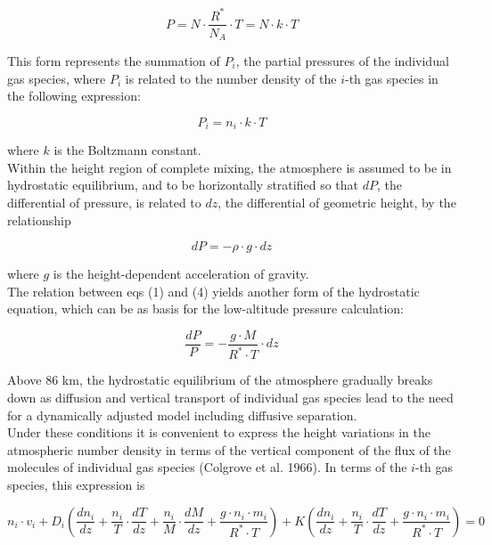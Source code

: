 \documentclass{article}
\begin{document}
\begin{equation}
    P = N \cdot \frac{R^*}{N_A} \cdot T = N \cdot k \cdot T \tag{2}
\end{equation}

This form represents the summation of \(P_i\), the partial pressures of the individual gas species, where \(P_i\) is related to the number density of the \(i\)-th gas species in the following expression:

\begin{equation}
    P_i = n_i \cdot k \cdot T \tag{3}
\end{equation}

where \(k\) is the Boltzmann constant. \\

Within the height region of complete mixing, the atmosphere is assumed to be in hydrostatic equilibrium, and to be horizontally stratified so that \(dP\), the differential of pressure, is related to \(dz\), the differential of geometric height, by the relationship

\begin{equation}
    dP = -\rho \cdot g \cdot dz \tag{4}
\end{equation}

where \(g\) is the height-dependent acceleration of gravity. \\
The relation between eqs (1) and (4) yields another form of the hydrostatic equation, which can be as basis for the low-altitude pressure calculation:

\begin{equation}
\frac{dP}{P} = -\frac{g \cdot M}{R^* \cdot T} \cdot dz \tag{5}
\end{equation}

Above 86 km, the hydrostatic equilibrium of the atmosphere gradually breaks down as diffusion and vertical transport of individual gas species lead to the need for a dynamically adjusted model including diffusive separation. \\
Under these conditions it is convenient to express the height variations in the atmospheric number density in terms of the vertical component of the flux of the molecules of individual gas species (Colgrove et al. 1966). In terms of the \(i\)-th gas species, this expression is

\begin{equation}
  n_i \cdot v_i  + D_i \left ( \frac{dn_i}{dz} + \frac{n_i}{T} \cdot \frac{dT}{dz} + \frac{n_i}{M} \cdot \frac{dM}{dz}  + \frac{g \cdot n_i \cdot m_i}{R^* \cdot T}  \right ) + K \left ( \frac{dn_i}{dz} + \frac{n_i}{T} \cdot \frac{dT}{dz}  + \frac{g \cdot n_i \cdot m_i}{R^* \cdot T} \right ) = 0 \tag{6}
\end{equation}
\end{document}
